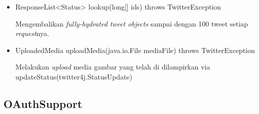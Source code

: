 \begin{itemize}
\begin{itemize}
			\item ResponseList<Status> lookup(long[] ids) throws TwitterException
			
			Mengembalikan \textit{fully-hydrated tweet objects} sampai dengan 100 tweet setiap \textit{request}nya.
			\item UploadedMedia uploadMedia(java.io.File mediaFile) throws TwitterException
			
			Melakukan \textit{upload} media gambar yang telah di dilampirkan via updateStatus(twitter4j.StatusUpdate)
		\end{itemize}
	\end{itemize}

	\subsection{OAuthSupport}
